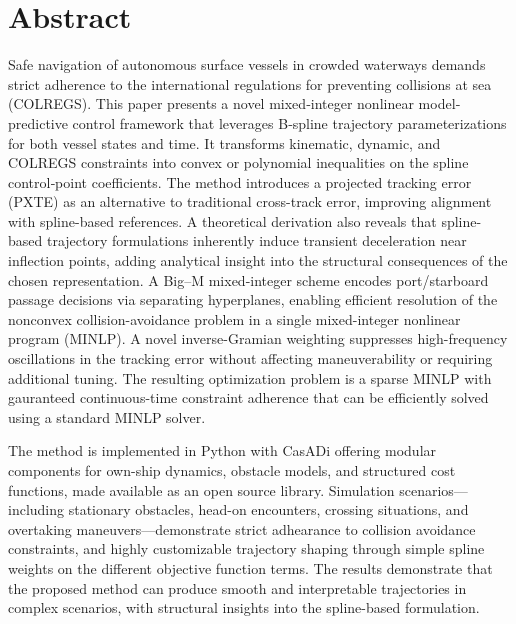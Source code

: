 
\pagestyle{fancy}
\fancyhf{}
\renewcommand{\chaptermark}[1]{\markboth{\chaptername\ \thechapter.\ #1}{}}
\renewcommand{\sectionmark}[1]{\markright{\thesection\ #1}}
\renewcommand{\headrulewidth}{0.1ex}
\renewcommand{\footrulewidth}{0.1ex}
\fancyfoot[LE,RO]{\thepage}
\fancypagestyle{plain}{\fancyhf{}\fancyfoot[LE,RO]{\thepage}\renewcommand{\headrulewidth}{0ex}}

\section*{\large Abstract}
\vspace{0.5cm}


Safe navigation of autonomous surface vessels in crowded waterways demands strict adherence to the international regulations for preventing collisions at sea (COLREGS). 
This paper presents a novel mixed‐integer nonlinear model‐predictive control framework that leverages B‐spline trajectory parameterizations for both vessel states and time. It transforms kinematic, dynamic, and COLREGS constraints into convex or polynomial inequalities on the spline control‐point coefficients.
The method introduces a projected tracking error (PXTE) as an alternative to traditional cross-track error, improving alignment with spline-based references. A theoretical derivation also reveals that spline-based trajectory formulations inherently induce transient deceleration near inflection points, adding analytical insight into the structural consequences of the chosen  representation.
A Big–M mixed-integer scheme encodes port/starboard passage decisions via separating hyperplanes, enabling efficient resolution of the nonconvex collision-avoidance problem in a single mixed-integer nonlinear program (MINLP).
A novel inverse-Gramian weighting suppresses high-frequency oscillations in the tracking error without affecting maneuverability or requiring additional tuning. The resulting optimization problem is a sparse MINLP with gauranteed continuous-time constraint adherence that can be efficiently solved using a standard MINLP solver.

The method is implemented in Python with CasADi offering modular components for own-ship dynamics, obstacle models, and structured cost functions, made available as an open source library. Simulation scenarios---including stationary obstacles, head-on encounters, crossing situations, and overtaking maneuvers---demonstrate strict adhearance to collision avoidance constraints, and highly customizable trajectory shaping through simple spline weights on the different objective function terms. The results demonstrate that the proposed method can produce smooth and interpretable 
trajectories in complex scenarios, with structural insights into the spline-based formulation.

